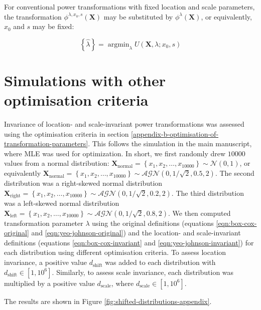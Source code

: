 \documentclass[preprint,12pt,authoryear]{elsarticle}
\DeclareMathOperator*{\argmin}{argmin}
\begin{document}
For conventional power transformations with fixed location and scale
parameters, the transformation \(\phi^{\lambda, x_0, s} (\mathbf{X})\)
may be substituted by \(\phi^{\lambda} (\mathbf{X})\), or equivalently,
\(x_0\) and \(s\) may be fixed:

\begin{equation}
\left\{ \hat{\lambda}\right\} = \argmin_{\lambda} U\left(\mathbf{X}, \lambda; x_0, s \right)
\end{equation}

\section{Simulations with other optimisation criteria}\label{appendix-c-simulations-with-other-optimisation-criteria}

Invariance of location- and scale-invariant power transformations was
assessed using the optimisation criteria in section
\ref{appendix-b-optimisation-of-transformation-parameters}. This follows the simulation in the main manuscript, where MLE was
used for optimization. In short, we first randomly drew \(10000\) values
from a normal distribution:
\(\mathbf{X}_{\text{normal}} = \left\{x_1, x_2, \ldots, x_{10000} \right\} \sim \mathcal{N}\left(0, 1\right)\),
or equivalently
\(\mathbf{X}_{\text{normal}} = \left\{x_1, x_2, \ldots, x_{10000} \right\} \sim \mathcal{AGN}\left(0, 1/\sqrt{2}, 0.5, 2\right)\).
The second distribution was a right-skewed normal distribution
\(\mathbf{X}_{\text{right}} = \left\{x_1, x_2, \ldots, x_{10000} \right\} \sim \mathcal{AGN}\left(0, 1/\sqrt{2}, 0.2, 2\right)\).
The third distribution was a left-skewed normal distribution
\(\mathbf{X}_{\text{left}} = \left\{x_1, x_2, \ldots, x_{10000} \right\} \sim \mathcal{AGN}\left(0, 1/\sqrt{2}, 0.8, 2\right)\).
We then computed transformation parameter \(\lambda\) using the original
definitions (equations \ref{eqn:box-cox-original} and
\ref{eqn:yeo-johnson-original}) and the location- and scale-invariant
definitions (equations \ref{eqn:box-cox-invariant} and
\ref{eqn:yeo-johnson-invariant}) for each distribution using different
optimisation criteria. To assess location invariance, a positive value
\(d_{\text{shift}}\) was added to each distribution with
\(d_{\text{shift}} \in [1, 10^6]\). Similarly, to assess scale
invariance, each distribution was multiplied by a positive value
\(d_{\text{scale}}\), where \(d_{\text{scale}} \in [1, 10^6]\).

The results are shown in Figure
\ref{fig:shifted-distributions-appendix}.
\end{document}

